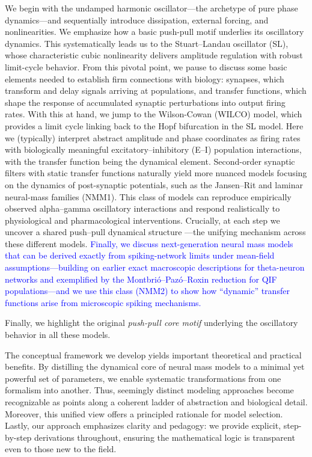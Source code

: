 \documentclass[12pt]{article}
\numberwithin{equation}{section}
\newcommand{\rev}[1]{\textcolor{blue}{#1}}
\begin{document}
We begin with the undamped harmonic oscillator—the archetype of pure phase dynamics—and sequentially introduce dissipation, external forcing, and nonlinearities. We emphasize how a basic push-pull motif underlies its oscillatory dynamics.  This systematically leads us to the Stuart–Landau oscillator (SL), whose characteristic cubic nonlinearity delivers amplitude regulation with robust limit-cycle behavior. From this pivotal point, we pause to discuss some basic elements needed to establish firm connections with biology: synapses, which transform and delay signals arriving at populations, and transfer functions, which shape the response of accumulated synaptic perturbations into output firing rates. 
With this at hand, we jump to the Wilson-Cowan (WILCO) model, which provides a limit cycle linking back to the Hopf bifurcation in the SL model. Here we (typically) interpret abstract amplitude and phase coordinates as firing rates with biologically meaningful excitatory–inhibitory (E–I) population interactions, with the transfer function being the dynamical element. 
Second-order synaptic filters with static transfer functions naturally yield more nuanced models focusing on the dynamics of post-synaptic potentials, such as the Jansen–Rit and laminar neural-mass families (NMM1). This class of models can reproduce empirically observed alpha–gamma oscillatory interactions and respond realistically to physiological and pharmacological interventions. Crucially, at each step we uncover a shared push–pull dynamical structure  ---the unifying mechanism across these different models.
\rev{Finally, we discuss next-generation neural mass models that can be derived exactly from spiking-network limits under mean-field assumptions—building on earlier exact macroscopic descriptions for theta-neuron networks and exemplified by the Montbrió–Pazó–Roxin reduction for QIF populations—and we use this class (NMM2) to show how “dynamic” transfer functions arise from microscopic spiking mechanisms. \cite{Montbrio:2015aa, so2014networks, luke2013complete}}

Finally, we highlight the original \textit{push-pull core motif} underlying the oscillatory behavior in all these models.


The conceptual framework we develop yields important theoretical and practical benefits. By distilling the dynamical core of neural mass models to a minimal yet powerful set of parameters, we enable systematic transformations from one formalism into another. Thus, seemingly distinct modeling approaches become recognizable as points along a coherent ladder of abstraction and biological detail. Moreover, this unified view offers a principled rationale for model selection.  
Lastly, our approach emphasizes clarity and pedagogy: we provide explicit, step-by-step derivations throughout, ensuring the mathematical logic is transparent even to those new to the field.
\end{document}
